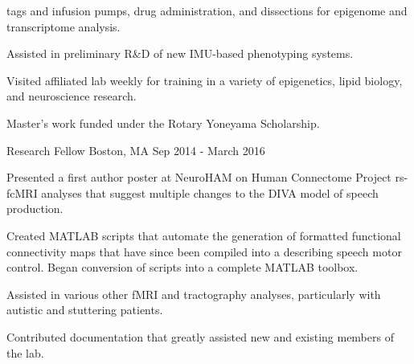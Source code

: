 \begin{cventries}
{\begin{cvitems}
{            tags and infusion pumps, drug administration, and dissections for epigenome
            and transcriptome analysis.\vspace*{0.1cm}}
        \item{Assisted in preliminary R\&D of new IMU-based phenotyping
            systems.\vspace*{0.1cm}}
        \item{Visited 
            {affiliated lab} weekly for training in a variety of epigenetics, lipid
            biology, and neuroscience research.\vspace*{0.1cm}}
        \item{Master's work funded under the Rotary Yoneyama 
            {Scholarship}.}
    \end{cvitems}}
    \vspace*{0.2cm}
    
    {Research Fellow}
    {Boston, MA}
    {Sep 2014 - March 2016}
    {\begin{cvitems}
        \item{Presented a first author 
            {poster} at NeuroHAM on Human Connectome Project rs-fcMRI analyses that
            suggest multiple changes to the DIVA model of speech 
            production.\vspace*{0.1cm}}
        \item{Created MATLAB scripts that automate the generation of formatted
            functional 
            {connectivity maps} that have since been compiled into a  describing speech motor control. Began
            conversion of scripts into a complete 
            {MATLAB toolbox}.\vspace*{0.1cm}}
        \item{Assisted in various other fMRI and tractography analyses, particularly
            with autistic and stuttering patients.\vspace*{0.1cm}}
        \item{Contributed 
            {documentation} that greatly assisted new and existing members of the lab.}
    \end{cvitems}}
    \vspace*{0.2cm}
    

\end{cventries}
